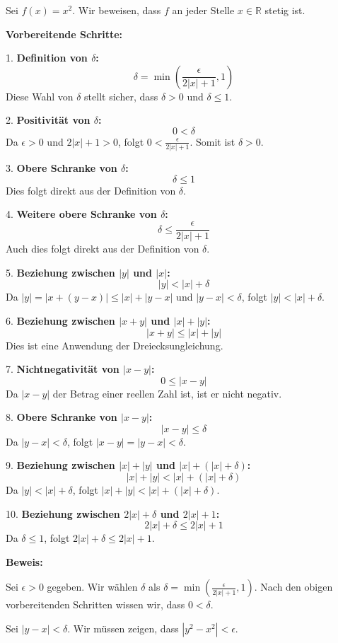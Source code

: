 \documentclass{article}
\begin{document}
Sei $f(x) = x^2$. Wir beweisen, dass $f$ an jeder Stelle $x \in \mathbb{R}$ stetig ist. 

\textbf{Vorbereitende Schritte:}

1. \textbf{Definition von $\delta$:}
   \[
   \delta = \min\left(\frac{\epsilon}{2|x| + 1}, 1\right)
   \]
   Diese Wahl von $\delta$ stellt sicher, dass $\delta > 0$ und $\delta \leq 1$.

2. \textbf{Positivität von $\delta$:}
   \[
   0 < \delta
   \]
   Da $\epsilon > 0$ und $2|x| + 1 > 0$, folgt $0 < \frac{\epsilon}{2|x| + 1}$. Somit ist $\delta > 0$.

3. \textbf{Obere Schranke von $\delta$:}
   \[
   \delta \leq 1
   \]
   Dies folgt direkt aus der Definition von $\delta$.

4. \textbf{Weitere obere Schranke von $\delta$:}
   \[
   \delta \leq \frac{\epsilon}{2|x| + 1}
   \]
   Auch dies folgt direkt aus der Definition von $\delta$.

5. \textbf{Beziehung zwischen $|y|$ und $|x|$:}
   \[
   |y| < |x| + \delta
   \]
   Da $|y| = |x + (y - x)| \leq |x| + |y - x|$ und $|y - x| < \delta$, folgt $|y| < |x| + \delta$.

6. \textbf{Beziehung zwischen $|x + y|$ und $|x| + |y|$:}
   \[
   |x + y| \leq |x| + |y|
   \]
   Dies ist eine Anwendung der Dreiecksungleichung.

7. \textbf{Nichtnegativität von $|x - y|$:}
   \[
   0 \leq |x - y|
   \]
   Da $|x - y|$ der Betrag einer reellen Zahl ist, ist er nicht negativ.

8. \textbf{Obere Schranke von $|x - y|$:}
   \[
   |x - y| \leq \delta
   \]
   Da $|y - x| < \delta$, folgt $|x - y| = |y - x| < \delta$.

9. \textbf{Beziehung zwischen $|x| + |y|$ und $|x| + (|x| + \delta)$:}
   \[
   |x| + |y| < |x| + (|x| + \delta)
   \]
   Da $|y| < |x| + \delta$, folgt $|x| + |y| < |x| + (|x| + \delta)$.

10. \textbf{Beziehung zwischen $2|x| + \delta$ und $2|x| + 1$:}
    \[
    2|x| + \delta \leq 2|x| + 1
    \]
    Da $\delta \leq 1$, folgt $2|x| + \delta \leq 2|x| + 1$.

\textbf{Beweis:}

Sei $\epsilon > 0$ gegeben. Wir wählen $\delta$ als $\delta = \min\left(\frac{\epsilon}{2|x| + 1}, 1\right)$. Nach den obigen vorbereitenden Schritten wissen wir, dass $0 < \delta$.

Sei $|y - x| < \delta$. Wir müssen zeigen, dass $|y^2 - x^2| < \epsilon$.
\end{document}

